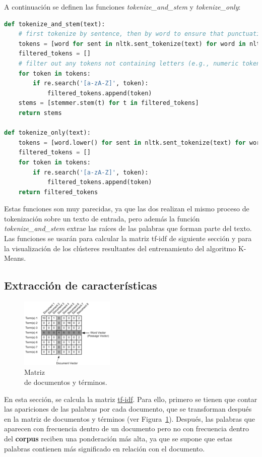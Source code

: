 \documentclass{uimppracticas}
\begin{document}
A continuación se definen las funciones \textit{tokenize\_and\_stem} y \textit{tokenize\_only}: 

\begin{lstlisting}[language=python]
def tokenize_and_stem(text):
	# first tokenize by sentence, then by word to ensure that punctuation is caught as it's own token
	tokens = [word for sent in nltk.sent_tokenize(text) for word in nltk.word_tokenize(sent)]
	filtered_tokens = []
	# filter out any tokens not containing letters (e.g., numeric tokens, raw punctuation)
	for token in tokens:
		if re.search('[a-zA-Z]', token):
			filtered_tokens.append(token)
	stems = [stemmer.stem(t) for t in filtered_tokens]
	return stems
	
def tokenize_only(text):
	tokens = [word.lower() for sent in nltk.sent_tokenize(text) for word in nltk.word_tokenize(sent)]
	filtered_tokens = []
	for token in tokens:
		if re.search('[a-zA-Z]', token):
			filtered_tokens.append(token)
	return filtered_tokens  
\end{lstlisting}

Estas funciones son muy parecidas, ya que las dos realizan el mismo proceso de tokenización sobre un texto de entrada, pero además la función \textit{tokenize\_and\_stem} extrae las raíces de las palabras que forman parte del texto. Las funciones se usarán para calcular la matriz tf-idf de siguiente sección y para la visualización de los clústeres resultantes del entrenamiento del algoritmo K-Means.

\subsection{Extracción de características}

\begin{figure}
	\centering
	\includegraphics[width=0.4\textwidth]{images/matrix}
	\caption{Matriz \\ de documentos y términos.}
	\label{matrix}
\end{figure}

En esta sección, se calcula la matriz \href{https://es.wikipedia.org/wiki/Tf-idf}{tf-idf}. Para ello, primero se tienen que contar las apariciones de las palabras por cada documento, que se transforman después en la matriz de documentos y términos (ver Figura~\ref{matrix}). Después, las palabras que aparecen con frecuencia dentro de un documento pero no con frecuencia dentro del \textbf{corpus} reciben una ponderación más alta, ya que se supone que estas palabras contienen más significado en relación con el documento.
\end{document}
